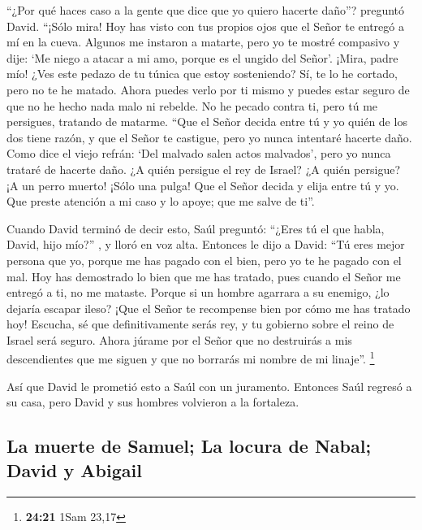  ``¿Por qué haces caso a la gente que dice que yo quiero
hacerte daño''? preguntó David.  ``¡Sólo mira! Hoy has
visto con tus propios ojos que el Señor te entregó a mí en la cueva.
Algunos me instaron a matarte, pero yo te mostré compasivo y dije: `Me
niego a atacar a mi amo, porque es el ungido del Señor'. 
¡Mira, padre mío! ¿Ves este pedazo de tu túnica que estoy sosteniendo?
Sí, te lo he cortado, pero no te he matado. Ahora puedes verlo por ti
mismo y puedes estar seguro de que no he hecho nada malo ni rebelde. No
he pecado contra ti, pero tú me persigues, tratando de matarme.
 ``Que el Señor decida entre tú y yo quién de los dos
tiene razón, y que el Señor te castigue, pero yo nunca intentaré hacerte
daño.  Como dice el viejo refrán: `Del malvado salen
actos malvados', pero yo nunca trataré de hacerte daño. 
¿A quién persigue el rey de Israel? ¿A quién persigue? ¡A un perro
muerto! ¡Sólo una pulga!  Que el Señor decida y elija
entre tú y yo. Que preste atención a mi caso y lo apoye; que me salve de
ti''.

 Cuando David terminó de decir esto, Saúl preguntó:
``¿Eres tú el que habla, David, hijo mío?'' , y lloró en voz alta.
 Entonces le dijo a David: ``Tú eres mejor persona que
yo, porque me has pagado con el bien, pero yo te he pagado con el mal.
 Hoy has demostrado lo bien que me has tratado, pues
cuando el Señor me entregó a ti, no me mataste.  Porque
si un hombre agarrara a su enemigo, ¿lo dejaría escapar ileso? ¡Que el
Señor te recompense bien por cómo me has tratado hoy! 
Escucha, sé que definitivamente serás rey, y tu gobierno sobre el reino
de Israel será seguro.  Ahora júrame por el Señor que no
destruirás a mis descendientes que me siguen y que no borrarás mi nombre
de mi linaje''. \footnote{\textbf{24:21} 1Sam 23,17}

 Así que David le prometió esto a Saúl con un juramento.
Entonces Saúl regresó a su casa, pero David y sus hombres volvieron a la
fortaleza.

\hypertarget{la-muerte-de-samuel-la-locura-de-nabal-david-y-abigail}{%
\subsection{La muerte de Samuel; La locura de Nabal; David y
Abigail}\label{la-muerte-de-samuel-la-locura-de-nabal-david-y-abigail}}

